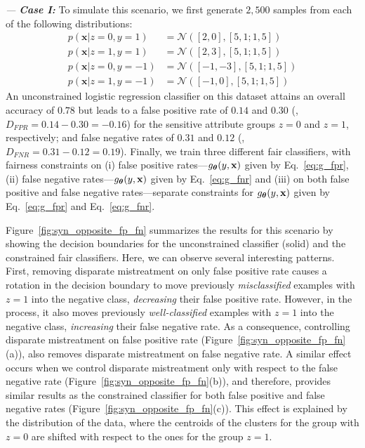 \documentclass[letterpaper]{sig-alternate-2013}
\newcommand{\xhdr}[1]{\vspace{0.5mm}\noindent{{\bf #1.}}}
\newcommand{\disc}{disparate mistreatment}
\begin{document}
\vspace{1.5mm}
\noindent \emph{--- \bf Case I:}
To simulate this scenario, we first generate $2{,}500$ samples from each of the  following distributions:
\begin{align}
p(\mathbf{x}|z=0, y=1) &= \mathcal{N}([2,0], [5, 1; 1, 5]) \nonumber \\
p(\mathbf{x}|z=1, y=1) &= \mathcal{N}([2,3], [5, 1; 1, 5]) \nonumber \\
p(\mathbf{x}|z=0, y=-1) &= \mathcal{N}([-1,-3], [5, 1; 1, 5]) \nonumber \\
p(\mathbf{x}|z=1, y=-1) &= \mathcal{N}([-1,0], [5, 1; 1, 5]) \nonumber
\end{align}
An unconstrained logistic regression classifier on this dataset attains an overall accuracy of $0.78$ but leads to a false positive rate of $0.14$ and $0.30$ (\ie, $D_{FPR} = 0.14 - 0.30 =-0.16$) for the sensitive attribute groups $z=0$ and $z=1$, respectively; and  false negative rates of $0.31$ and $0.12$ (\ie, $D_{FNR} = 0.31 - 0.12 = 0.19$).
Finally, we train three different fair classifiers, with fairness constraints on (i) false positive rates---$g_{\boldsymbol{\theta}}(y, \mathbf{x})$  given by Eq.~\eqref{eq:g_fpr}, (ii) false negative rates---$g_{\boldsymbol{\theta}}(y, \mathbf{x})$  given by Eq.~\eqref{eq:g_fnr} and (iii) on both false positive and false negative rates---separate constraints for $g_{\boldsymbol{\theta}}(y, \mathbf{x})$ given by Eq.~\eqref{eq:g_fpr} and Eq.~\eqref{eq:g_fnr}.

\vspace{1.5mm}
\xhdr{Results}
Figure~\ref{fig:syn_opposite_fp_fn} summarizes the results for this scenario by showing the decision boundaries for the unconstrained classifier (solid) and the constrained fair classifiers.
Here, we can observe several interesting patterns.
First, removing \disc{} on only false positive rate causes a rotation in the decision boundary to move previously  \emph{misclassified}  examples with $z=1$ into the negative class, \emph{decreasing} their false positive rate. However, in the process, it also moves previously \emph{well-classified} examples with $z=1$ into the negative class, \emph{increasing} their false negative rate.
As a consequence, controlling \disc{} on false positive rate (Figure~\ref{fig:syn_opposite_fp_fn}(a)), also  removes \disc{} on false negative rate.
A similar effect occurs when we control \disc{} only with respect to the false negative rate (Figure~\ref{fig:syn_opposite_fp_fn}(b)), and therefore, provides similar results as the constrained classifier for both false positive and false negative rates (Figure~\ref{fig:syn_opposite_fp_fn}(c)).
This effect is explained by the distribution of the data, where the centroids of the clusters for the group with $z=0$ are shifted with respect to the ones for the group $z=1$.
\end{document}
